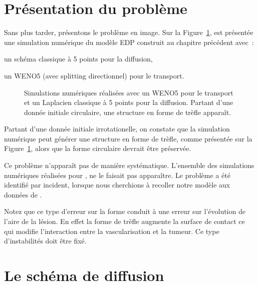 \documentclass[main.tex]{subfiles}
\begin{document}
\section{Présentation du problème}
Sans plus tarder, présentons le problème en image. Sur la Figure~\ref{fig:trefle}, est présentée une simulation numérique du modèle EDP construit au chapitre précédent avec~:
\begin{myitemize}
\item un schéma classique à 5 points pour la diffusion,
\item un WENO5 (avec splitting directionnel) pour le transport.
\end{myitemize}
\begin{figure}
\centering
\caption{\label{fig:trefle} Simulations numériques réalisées avec un WENO5 pour le transport et un Laplacien classique à 5 points pour la diffusion. Partant d'une donnée initiale circulaire, 
une structure en forme de trèfle apparaît.}
\end{figure}

Partant d'une donnée initiale irrotationelle, on constate que la simulation numérique peut générer une structure en forme de trèfle, comme présentée  sur la Figure~\ref{fig:trefle}, alors que la forme circulaire devrait être préservée. 

Ce problème n'apparaît pas de manière systématique. L'ensemble des simulations numériques réalisées pour \Nber, ne le faisait pas apparaître. Le problème a été identifié par incident, lorsque nous cherchions à recoller notre modèle aux données de \Chen. 


Notez que ce type d'erreur sur la forme conduit à une erreur sur l'évolution de l'aire de la lésion. En effet la forme de trèfle augmente la surface de contact ce qui modifie l'interaction entre la vascularisation et la tumeur. Ce type d'instabilités doit être fixé.


\section{Le schéma de diffusion}
\end{document}
